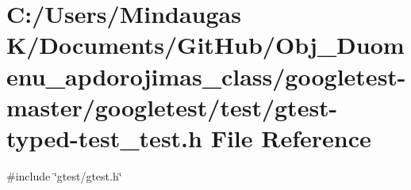 \hypertarget{googletest-master_2googletest_2test_2gtest-typed-test__test_8h}{}\section{C\+:/\+Users/\+Mindaugas K/\+Documents/\+Git\+Hub/\+Obj\+\_\+\+Duomenu\+\_\+apdorojimas\+\_\+class/googletest-\/master/googletest/test/gtest-\/typed-\/test\+\_\+test.h File Reference}
\label{googletest-master_2googletest_2test_2gtest-typed-test__test_8h}
{\ttfamily \#include \char`\"{}gtest/gtest.\+h\char`\"{}}\newline
